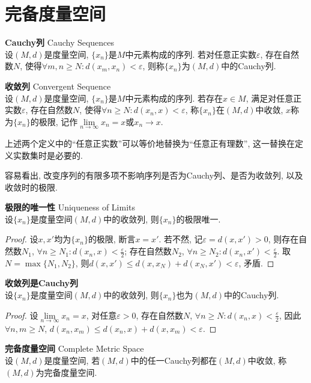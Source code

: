 
\section{完备度量空间}

\begin{dfn} \textbf{Cauchy列} Cauchy Sequences\\
设$(M,d)$是度量空间, $\{x_n\}$是$M$中元素构成的序列. 若对任意正实数$\varepsilon$, 存在自然数$N$, 使得$\forall m,n\ge N: d(x_m,x_n)<\varepsilon$, 则称$\{x_n\}$为$(M,d)$中的Cauchy列. 
\end{dfn}


\begin{dfn}\textbf{收敛列} Convergent Sequence\\
设$(M,d)$是度量空间, $\{x_n\}$是$M$中元素构成的序列. 若存在$x\in M$, 满足对任意正实数$\varepsilon$, 存在自然数$N$, 使得$\forall n\ge N: d(x_n,x)<\varepsilon$, 称$\{x_n\}$在$(M,d)$中收敛, $x$称为$\{x_n\}$的极限, 记作$\lim\limits_{n\to \infty} x_n =x$或$x_n \to x$.
\label{def:seq_conv}
\end{dfn}
\par 上述两个定义中的“任意正实数”可以等价地替换为“任意正有理数”, 这一替换在定义实数集时是必要的. 
\par 容易看出, 改变序列的有限多项不影响序列是否为Cauchy列、是否为收敛列, 以及收敛时的极限. 

\begin{pro}\textbf{极限的唯一性} Uniqueness of Limits\\
设$\{x_n\}$是度量空间$(M,d)$中的收敛列, 则$\{x_n\}$的极限唯一. 
\end{pro}
\begin{proof}
设$x,x'$均为$\{x_n\}$的极限, 断言$x=x'$. 若不然, 记$\varepsilon = d(x,x')>0$, 则存在自然数$N_1$, $\forall n\ge N_1: d(x_n,x)<\frac{\varepsilon}{2}$; 存在自然数$N_2$, $\forall n\ge N_2: d(x_n,x')<\frac{\varepsilon}{2}$. 取$N=\max\{N_1, N_2\}$, 则$d(x,x')\le d(x,x_N)+d(x_N, x')<\varepsilon$, 矛盾. 
\end{proof}

\begin{pro}\textbf{收敛列是Cauchy列}\\
设$\{x_n\}$是度量空间$(M,d)$中的收敛列, 则$\{x_n\}$也为$(M,d)$中的Cauchy列.
\end{pro}
\begin{proof}
设$\lim\limits_{n\to \infty} x_n =x$, 对任意$\varepsilon>0$, 存在自然数$N$, $\forall n\ge N: d(x_n,x)<\frac{\varepsilon}{2}$, 因此$\forall n,m \ge N$, $d(x_n,x_m)\le d(x_n,x)+d(x,x_m)<\varepsilon$. 
\end{proof}

\begin{dfn}\textbf{完备度量空间} Complete Metric Space\\
设$(M,d)$是度量空间, 若$(M,d)$中的任一Cauchy列都在$(M,d)$中收敛, 称$(M,d)$为完备度量空间. 
\end{dfn}